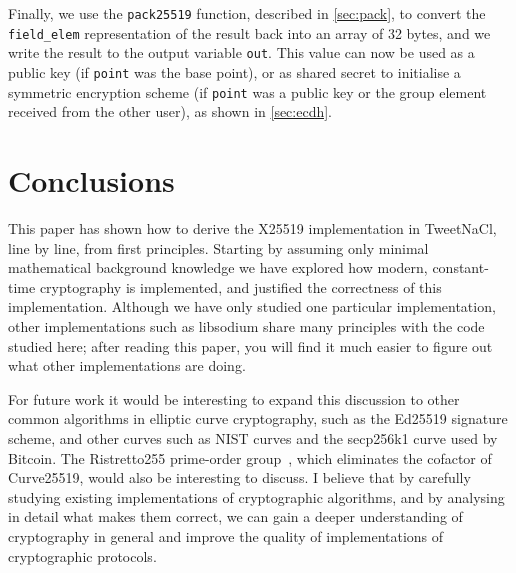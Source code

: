 \documentclass[manuscript]{acmart}
\begin{document}
Finally, we use the \verb|pack25519| function, described in \autoref{sec:pack}, to convert the \verb|field_elem| representation of the result back into an array of 32 bytes, and we write the result to the output variable \verb|out|.
This value can now be used as a public key (if \verb|point| was the base point), or as shared secret to initialise a symmetric encryption scheme (if \verb|point| was a public key or the group element received from the other user), as shown in \autoref{sec:ecdh}.

\section{Conclusions}

This paper has shown how to derive the X25519 implementation in TweetNaCl, line by line, from first principles.
Starting by assuming only minimal mathematical background knowledge we have explored how modern, constant-time cryptography is implemented, and justified the correctness of this implementation.
Although we have only studied one particular implementation, other implementations such as libsodium share many principles with the code studied here; after reading this paper, you will find it much easier to figure out what other implementations are doing.

For future work it would be interesting to expand this discussion to other common algorithms in elliptic curve cryptography, such as the Ed25519 signature scheme, and other curves such as NIST curves and the secp256k1 curve used by Bitcoin.
The Ristretto255 prime-order group~\cite{Ristretto255}, which eliminates the cofactor of Curve25519, would also be interesting to discuss.
I believe that by carefully studying existing implementations of cryptographic algorithms, and by analysing in detail what makes them correct, we can gain a deeper understanding of cryptography in general and improve the quality of implementations of cryptographic protocols.



\end{document}
